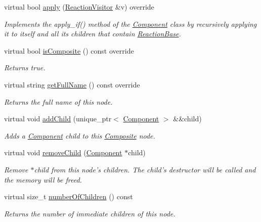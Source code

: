 \begin{DoxyCompactItemize}
virtual bool \hyperlink{classComposite_aa4a608ee92aaaa6e0d63278595707474}{apply} (\hyperlink{classReactionVisitor}{Reaction\+Visitor} \&v) override
\begin{DoxyCompactList}\small\item\em Implements the apply\+\_\+if() method of the \hyperlink{classComponent}{Component} class by recursively applying it to itself and all its children that contain \hyperlink{classReactionBase}{Reaction\+Base}. \end{DoxyCompactList}\item 
virtual bool \hyperlink{classComposite_ae2c806010c5c1d2d166ce01f2710c271}{is\+Composite} () const override
\begin{DoxyCompactList}\small\item\em Returns true. \end{DoxyCompactList}\item 
virtual string \hyperlink{classComposite_a0219bb2449696a3ab84ff24e4462e2c2}{get\+Full\+Name} () const override
\begin{DoxyCompactList}\small\item\em Returns the full name of this node. \end{DoxyCompactList}\item 
virtual void \hyperlink{classComposite_aa3ebdb54e65379954e5f28cd84f00be0}{add\+Child} (unique\+\_\+ptr$<$ \hyperlink{classComponent}{Component} $>$ \&\&child)
\begin{DoxyCompactList}\small\item\em Adds a \hyperlink{classComponent}{Component} child to this \hyperlink{classComposite}{Composite} node. \end{DoxyCompactList}\item 
virtual void \hyperlink{classComposite_a1e62d11f4c16844277b215a2069c14be}{remove\+Child} (\hyperlink{classComponent}{Component} $\ast$child)
\begin{DoxyCompactList}\small\item\em Remove $\ast$child from this node's children. The child's destructor will be called and the memory will be freed. \end{DoxyCompactList}\item 
virtual size\+\_\+t \hyperlink{classComposite_ab00f34ad7c8f7cd90ea9392bd54fd62a}{number\+Of\+Children} () const 
\begin{DoxyCompactList}\small\item\em Returns the number of immediate children of this node. \end{DoxyCompactList}\item 

\end{DoxyCompactItemize}
